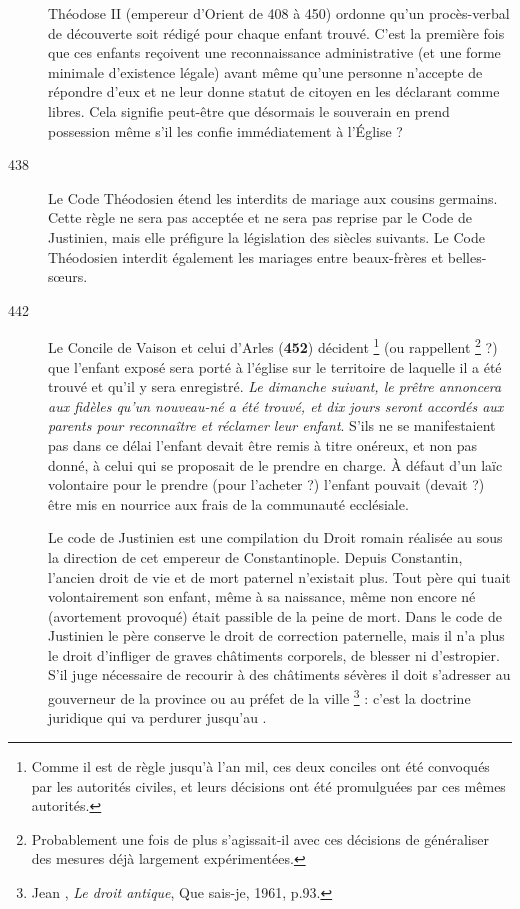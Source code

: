 \begin{description}
 Théodose II (empereur d'Orient de 408 à 450) ordonne qu'un procès-verbal de découverte soit rédigé pour chaque enfant trouvé. C'est la première fois que ces enfants reçoivent une reconnaissance administrative (et une forme minimale d'existence légale) avant même qu'une personne n'accepte de répondre d'eux et ne leur donne statut de citoyen en les déclarant comme libres. Cela signifie peut-être que désormais le souverain en prend possession même s'il les confie immédiatement à l'Église ? 

\item[438] Le Code Théodosien étend les interdits de mariage aux cousins germains. Cette règle ne sera pas acceptée et ne sera pas reprise par le Code de Justinien, mais elle préfigure la législation des siècles suivants. Le Code Théodosien interdit également les mariages entre beaux-frères et belles-sœurs.

\item[442] Le Concile de Vaison et celui d'Arles (\textbf{452})
décident%
\footnote{Comme il est de règle jusqu'à l'an mil, ces deux conciles ont été convoqués par les autorités civiles, et leurs décisions ont été promulguées par ces mêmes autorités.} 
(ou rappellent%
\footnote{Probablement une fois de plus s'agissait-il avec ces décisions de généraliser des mesures déjà largement expérimentées.} 
 ?) que l'enfant exposé sera porté à l'église sur le territoire de laquelle il a été trouvé et qu'il y sera enregistré. \emph{Le dimanche suivant, le prêtre annoncera aux fidèles qu'un nouveau-né a été trouvé, et dix jours seront accordés aux parents pour reconnaître et réclamer leur enfant}. S'ils ne se manifestaient pas dans ce délai l'enfant devait être remis à titre onéreux, et non pas donné, à celui qui se proposait de le prendre en charge. À défaut d'un laïc volontaire pour le prendre (pour l'acheter ?) l'enfant pouvait (devait ?) être mis en nourrice aux frais de la communauté ecclésiale. 

 Le code de Justinien est une compilation du Droit romain réalisée au  sous la direction de cet empereur de Constantinople. Depuis Constantin, l'ancien droit de vie et de mort paternel  n'existait plus. Tout père qui tuait volontairement son enfant, même à sa naissance, même non encore né (avortement provoqué) était passible de la peine de mort. Dans le code de Justinien le père conserve le droit de correction paternelle, mais il n'a plus le droit d'infliger de graves châtiments corporels, de blesser ni d'estropier. S'il juge nécessaire de recourir à des châtiments sévères il doit s'adresser au gouverneur de la province ou au préfet de la ville%
\footnote{Jean , \emph{Le droit antique}, Que sais-je, 1961, p.93.} 
 : c'est la doctrine juridique qui va perdurer jusqu'au . 


\end{description}
